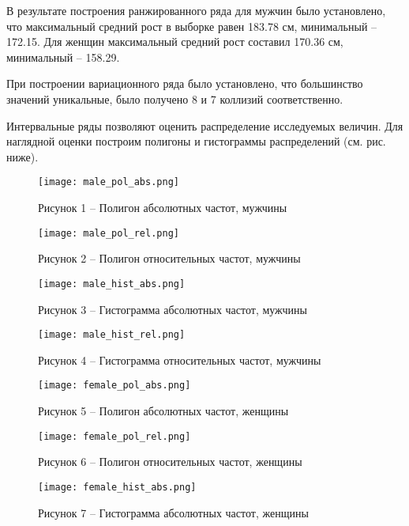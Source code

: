 В результате построения ранжированного ряда для мужчин было установлено,
что максимальный средний рост в выборке равен 183.78 см, минимальный -- 172.15.
Для женщин максимальный средний рост составил 170.36 см, минимальный -- 158.29.

При построении вариационного ряда было установлено, что большинство значений
уникальные, было получено 8 и 7 коллизий соответственно.

Интервальные ряды позволяют оценить распределение исследуемых величин.
Для наглядной оценки построим полигоны и гистограммы распределений (см. рис. ниже).

\begin{figure}[H]
    \centering
    \texttt{[image: male\_pol\_abs.png]}
    \caption*{Рисунок 1 -- Полигон абсолютных частот, мужчины}
    \label{fig:1}
\end{figure}

\begin{figure}[H]
    \centering
    \texttt{[image: male\_pol\_rel.png]}
    \caption*{Рисунок 2 -- Полигон относительных частот, мужчины}
    \label{fig:2}
\end{figure}

\begin{figure}[H]
    \centering
    \texttt{[image: male\_hist\_abs.png]}
    \caption*{Рисунок 3 -- Гистограмма абсолютных частот, мужчины}
    \label{fig:3}
\end{figure}

\begin{figure}[H]
    \centering
    \texttt{[image: male\_hist\_rel.png]}
    \caption*{Рисунок 4 -- Гистограмма относительных частот, мужчины}
    \label{fig:4}
\end{figure}

\begin{figure}[H]
    \centering
    \texttt{[image: female\_pol\_abs.png]}
    \caption*{Рисунок 5 -- Полигон абсолютных частот, женщины}
    \label{fig:5}
\end{figure}

\begin{figure}[H]
    \centering
    \texttt{[image: female\_pol\_rel.png]}
    \caption*{Рисунок 6 -- Полигон относительных частот, женщины}
    \label{fig:6}
\end{figure}

\begin{figure}[H]
    \centering
    \texttt{[image: female\_hist\_abs.png]}
    \caption*{Рисунок 7 -- Гистограмма абсолютных частот, женщины}
    \label{fig:7}
\end{figure}

